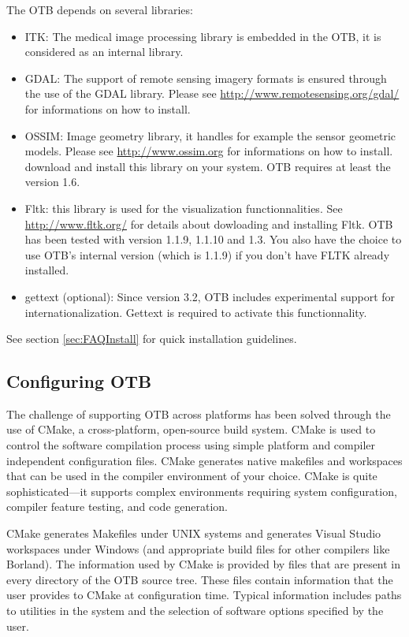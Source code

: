 The OTB depends on several libraries:
\begin{itemize}
\item ITK: The medical image processing library is embedded in the OTB, it is considered as an internal library.
\item GDAL: The support of remote sensing imagery formats is ensured
  through the use of the GDAL library. Please see
  \url{http://www.remotesensing.org/gdal/} for informations on how to install.
\item OSSIM: Image geometry library, it handles for example the sensor geometric models. 
  Please see \url{http://www.ossim.org} for informations on how to install.
download and install this library on your system. OTB requires at least the version 1.6.
\item Fltk: this library is used for the visualization
  functionnalities. See \url{http://www.fltk.org/} for details about
  dowloading and installing Fltk. OTB has been tested with version 1.1.9,
  1.1.10 and 1.3. You also have the choice to use OTB's internal
  version (which is 1.1.9) if you don't have FLTK already installed.
\item gettext (optional): Since version 3.2, OTB includes experimental support 
  for internationalization. Gettext is required to activate this 
  functionnality.  
\end{itemize}

See section \ref{sec:FAQInstall} for quick installation guidelines.

\subsection{Configuring OTB}
\label{sec:ConfiguringOTB}


The challenge of supporting OTB across platforms has been solved through the
use of CMake, a cross-platform, open-source build system. CMake is used to
control the software compilation process using simple platform and compiler
independent configuration files.  CMake generates native makefiles and
workspaces that can be used in the compiler environment of your choice. CMake
is quite sophisticated---it supports complex environments requiring system
configuration, compiler feature testing, and code generation.

CMake generates Makefiles under UNIX systems and generates Visual
Studio workspaces under Windows (and appropriate build files for other
compilers like Borland). The information used by CMake is provided by
 files that are present in every directory of the OTB
source tree. These files contain information that the user
provides to CMake at configuration time. Typical information includes paths
to utilities in the system and the selection of software options specified by
the user.

